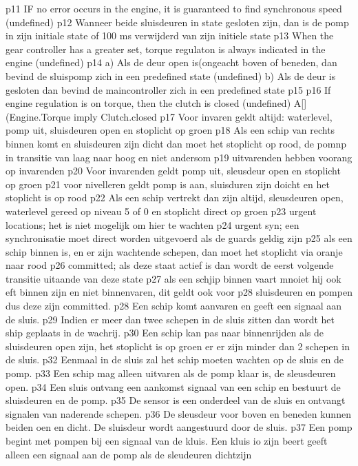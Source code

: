  
 p11 IF no error occurs in the engine, it is guaranteed to find synchronous speed (undefined)
 p12 Wanneer beide sluisdeuren in state gesloten zijn, dan is de pomp in zijn initiale state of 100 ms verwijderd van zijn initiele state
 p13 When the gear controller has a greater set, torque regulaton is always indicated in the engine (undefined)
 p14
 a) Als de deur open is(ongeacht boven of beneden, dan bevind de sluispomp zich in een  predefined state (undefined)
 b) Als de deur is gesloten dan bevind de maincontroller zich in een predefined state
 p15
 p16 If engine regulation is on torque, then the clutch is closed (undefined)
 A[](Engine.Torque imply Clutch.closed
 p17
 Voor invaren geldt altijd: waterlevel, pomp uit, sluisdeuren open en stoplicht op groen
 p18 Als een schip van rechts binnen komt en sluisdeuren zijn dicht dan moet het stoplicht op rood, de pomnp in transitie van laag naar hoog en niet andersom
 p19 uitvarenden hebben voorang op invarenden
 p20 Voor invarenden geldt pomp uit, sleusdeur open en stoplicht op groen
 p21 voor nivelleren geldt pomp is aan, sluisduren zijn doicht en het stoplicht is op rood
 p22 Als een schip vertrekt dan zijn altijd, sleusdeuren open, waterlevel gereed op niveau 5 of 0 en stoplicht direct op groen
 p23 urgent locations; het is niet mogelijk om hier te wachten
 p24 urgent syn; een synchronisatie moet direct worden uitgevoerd als de guards geldig zijn
 p25 als een schip binnen is, en er zijn wachtende schepen, dan moet het stoplicht via oranje naar rood
 p26 committed; als deze staat actief is dan wordt de eerst volgende transitie uitaande van deze state
 p27 als een schjip binnen vaart mnoiet hij ook eft binnen zijn en niet binnenvaren, dit geldt ook voor p28 sluisdeuren en pompen dus deze zijn committed.
 p28 Een schip komt aanvaren en geeft een signaal aan de sluis. 	
 p29 Indien er meer dan twee schepen in de sluis zitten dan wordt het ship geplaats in de wachrij. 
 p30 Een schip kan pas naar binnenrijden als de sluisdeuren open zijn, het stoplicht is op groen er er zijn minder dan 2 schepen in de sluis. 	
 p32 Eenmaal in de sluis zal het schip moeten wachten op de sluis en de pomp. 	
 p33 Een schip mag alleen uitvaren als de pomp klaar is, de sleusdeuren open. 
 p34 Een sluis ontvang een aankomst signaal van een schip en bestuurt de sluisdeuren en de pomp. 
 p35 De sensor is een onderdeel van de sluis en ontvangt signalen van naderende schepen. 
 p36 De sleusdeur voor boven en beneden kunnen beiden oen en dicht. De sluisdeur wordt aangestuurd door de sluis. 
 p37 Een pomp begint met pompen bij een signaal van de kluis. Een kluis io zijn beert geeft alleen een signaal aan de pomp als de sleudeuren dichtzijn
